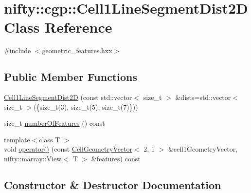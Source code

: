 \hypertarget{classnifty_1_1cgp_1_1Cell1LineSegmentDist2D}{}\section{nifty\+:\+:cgp\+:\+:Cell1\+Line\+Segment\+Dist2\+D Class Reference}
\label{classnifty_1_1cgp_1_1Cell1LineSegmentDist2D}


{\ttfamily \#include $<$geometric\+\_\+features.\+hxx$>$}

\subsection*{Public Member Functions}
\begin{DoxyCompactItemize}
\item 
\hyperlink{classnifty_1_1cgp_1_1Cell1LineSegmentDist2D_a5d5bf2934bf6be384bff119e69ca275b}{Cell1\+Line\+Segment\+Dist2\+D} (const std\+::vector$<$ size\+\_\+t $>$ \&dists=std\+::vector$<$ size\+\_\+t $>$(\{size\+\_\+t(3), size\+\_\+t(5), size\+\_\+t(7)\}))
\item 
size\+\_\+t \hyperlink{classnifty_1_1cgp_1_1Cell1LineSegmentDist2D_a993da64ae0e96d92daa94ab7a4a8195b}{number\+Of\+Features} () const 
\item 
{\footnotesize template$<$class T $>$ }\\void \hyperlink{classnifty_1_1cgp_1_1Cell1LineSegmentDist2D_a57d9c462ac4f0ed150d57ab752d4c689}{operator()} (const \hyperlink{classnifty_1_1cgp_1_1CellGeometryVector}{Cell\+Geometry\+Vector}$<$ 2, 1 $>$ \&cell1\+Geometry\+Vector, nifty\+::marray\+::\+View$<$ T $>$ \&features) const 
\end{DoxyCompactItemize}


\subsection{Constructor \& Destructor Documentation}
\hypertarget{classnifty_1_1cgp_1_1Cell1LineSegmentDist2D_a5d5bf2934bf6be384bff119e69ca275b}{}
